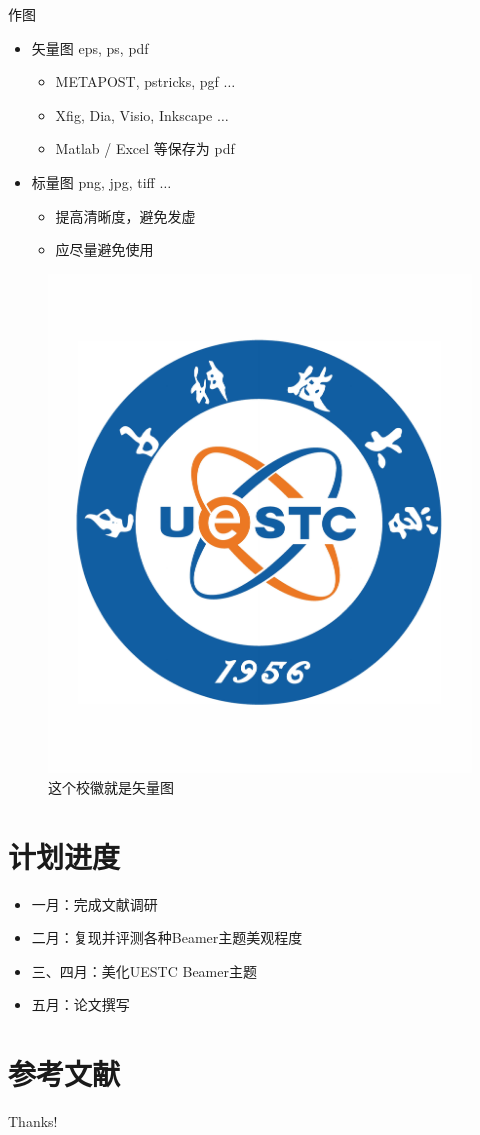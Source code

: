 \documentclass{beamer}
\begin{document}
\begin{frame}{作图}
    \begin{itemize}
        \item 矢量图 eps, ps, pdf
              \begin{itemize}
                  \item METAPOST, pstricks, pgf $\ldots$
                  \item Xfig, Dia, Visio, Inkscape $\ldots$
                  \item Matlab / Excel 等保存为 pdf
              \end{itemize}
        \item 标量图 png, jpg, tiff $\ldots$
              \begin{itemize}
                  \item 提高清晰度，避免发虚
                  \item 应尽量避免使用
              \end{itemize}
    \end{itemize}
    \begin{figure}[htpb]
        \centering
        \includegraphics[width=0.2\linewidth]{pic/logo.pdf}
        \caption{这个校徽就是矢量图}
    \end{figure}
\end{frame}


\section{计划进度}
\begin{frame}
    \begin{itemize}
        \item 一月：完成文献调研
        \item 二月：复现并评测各种Beamer主题美观程度
        \item 三、四月：美化UESTC Beamer主题
        \item 五月：论文撰写
    \end{itemize}
\end{frame}


\section{参考文献}

\begin{frame}[allowframebreaks]
    \newcommand{\bstlabelmark}{lo}
    \nocite{*}
    
    
\end{frame}

\begin{frame}
    \begin{center}
        {\Huge\calligra Thanks!}
    \end{center}
\end{frame}
\end{document}
